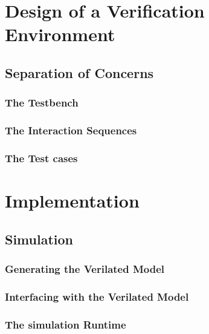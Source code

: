 \documentclass[11pt]{book}
\begin{document}
\chapter{Design of a Verification Environment} %

\section{Separation of Concerns} %

\subsection{The Testbench}

\subsection{The Interaction Sequences}

\subsection{The Test cases}




\chapter{Implementation} %

\section{Simulation} %

\subsection{Generating the Verilated Model} 

\subsection{Interfacing with the Verilated Model}

\subsection{The simulation Runtime} 
\end{document}
